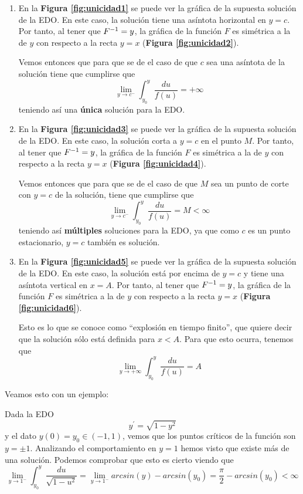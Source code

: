 \documentclass{mathnotes}
\begin{document}
\begin{enumerate}
\item En la \textbf{Figura \ref{fig:unicidad1}} se puede ver la gráfica de la supuesta solución de la EDO. En este caso, la solución tiene una asíntota horizontal en $y=c$. Por tanto, al tener que $F^{-1} = y$, la gráfica de la función $F$ es simétrica a la de $y$ con respecto a la recta $y=x$ (\textbf{Figura \ref{fig:unicidad2}}).

Vemos entonces que para que se de el caso de que $c$ sea una asíntota de la solución tiene que cumplirse que $$\lim _{y\to c^-} \int_{y_0}^y \frac{du}{f(u)} = +\infty$$
teniendo así una \textbf{única} solución para la EDO.

\item En la \textbf{Figura \ref{fig:unicidad3}} se puede ver la gráfica de la supuesta solución de la EDO. En este caso, la solución corta a $y=c$ en el punto $M$. Por tanto, al tener que $F^{-1} = y$, la gráfica de la función $F$ es simétrica a la de $y$ con respecto a la recta $y=x$ (\textbf{Figura \ref{fig:unicidad4}}).

Vemos entonces que para que se de el caso de que $M$ sea un punto de corte con $y=c$ de la solución, tiene que cumplirse que $$\lim _{y\to c^-} \int_{y_0}^y \frac{du}{f(u)} = M \lt \infty$$
teniendo así \textbf{múltiples} soluciones para la EDO, ya que como $c$ es un punto estacionario, $y=c$ también es solución.

\item En la \textbf{Figura \ref{fig:unicidad5}} se puede ver la gráfica de la supuesta solución de la EDO. En este caso, la solución está por encima de $y=c$ y tiene una asíntota vertical en $x=A$. Por tanto, al tener que $F^{-1} = y$, la gráfica de la función $F$ es simétrica a la de $y$ con respecto a la recta $y=x$ (\textbf{Figura \ref{fig:unicidad6}}).

Esto es lo que se conoce como ``explosión en tiempo finito'', que quiere decir que la solución sólo está definida para $x\lt A$. Para que esto ocurra, tenemos que $$\lim _{y\to + \infty} \int_{y_0}^y \frac{du}{f(u)} = A$$
\end{enumerate}

Veamos esto con un ejemplo:

\begin{example}
Dada la EDO $$y^\prime = \sqrt{1-y^2}$$ y el dato $y(0) = y_0\in(-1,1)$, 
vemos que los puntos críticos de la función son $y=\pm1$.
Analizando el comportamiento en $y=1$ hemos visto que existe más de una solución. Podemos comprobar que esto es cierto viendo que
$$\lim_{y\to 1^-}\int_{y_0}^y \frac{du}{\sqrt{1-u^2}} = \lim_{y\to 1^-} arcsin(y) - arcsin(y_0) = \frac{\pi}{2}-arcsin(y_0) \lt \infty$$
\end{example}
\end{document}
